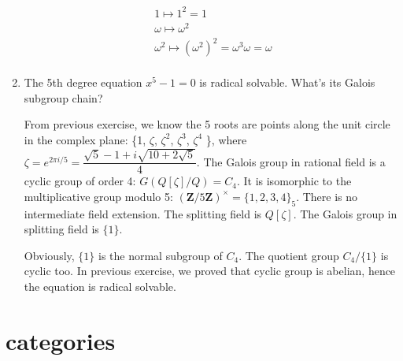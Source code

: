 \documentclass[UTF8]{article}
\begin{document}
\begin{enumerate}
\begin{mdframed}
\[
\begin{array}{l}
1 \mapsto 1^2 = 1 \\
\omega \mapsto \omega^2 \\
\omega^2 \mapsto (\omega^2)^2 = \omega^3 \omega = \omega \\
\end{array}
\]

\end{mdframed}

\item {The 5th degree equation $x^5 - 1 = 0$ is radical solvable. What's its Galois subgroup chain?}

From previous exercise, we know the 5 roots are points along the unit circle in the complex plane: \{1, $\zeta$, $\zeta^2$, $\zeta^3$, $\zeta^4$ \}, where $\zeta = e^{2 \pi i / 5} = \dfrac{\sqrt{5} - 1 + i\sqrt{10 + 2 \sqrt{5}}}{4}$. The Galois group in rational field is a cyclic group of order 4: $G(Q[\zeta]/Q) = C_4$. It is isomorphic to the multiplicative group modulo 5: $(\pmb{Z}/5\pmb{Z})^{\times} = \{1, 2, 3, 4 \}_5$. There is no intermediate field extension. The splitting field is $Q[\zeta]$. The Galois group in splitting field is $\{1\}$.

Obviously, $\{1\}$ is the normal subgroup of $C_4$. The quotient group $C_4/\{1\}$ is cyclic too. In previous exercise, we proved that cyclic group is abelian, hence the equation is radical solvable.

\end{enumerate}

\section{categories}
\end{document}
